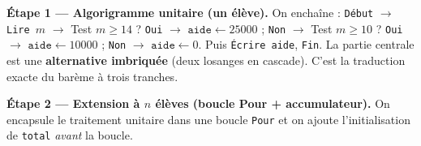 \documentclass[11pt]{article}
\begin{document}
\begin{exoresolu}

\textbf{Étape 1 — Algorigramme unitaire (un élève).}
On enchaîne : \texttt{Début} $\rightarrow$ \texttt{Lire $m$} $\rightarrow$ Test $m \geq 14$ ? \texttt{Oui} $\rightarrow$ $\texttt{aide} \leftarrow 25000$ ; \texttt{Non} $\rightarrow$ Test $m \geq 10$ ? \texttt{Oui} $\rightarrow$ $\texttt{aide} \leftarrow 10000$ ; \texttt{Non} $\rightarrow$ $\texttt{aide} \leftarrow 0$. Puis \texttt{Écrire aide}, \texttt{Fin}.
La partie centrale est une \textbf{alternative imbriquée} (deux losanges en cascade). C'est la traduction exacte du barème à trois tranches.

\textbf{Étape 2 — Extension à $n$ élèves (boucle Pour + accumulateur).}
On encapsule le traitement unitaire dans une boucle \texttt{Pour} et on ajoute l'initialisation de \texttt{total} \emph{avant} la boucle.


\end{exoresolu}
\end{document}
